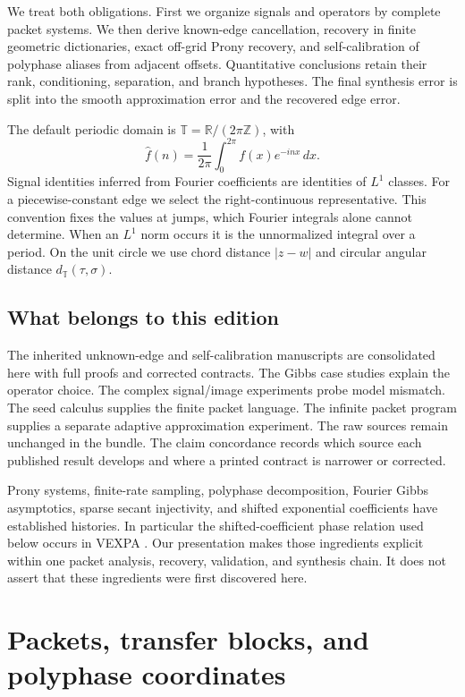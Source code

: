 \documentclass[11pt]{article}
\theoremstyle{definition}\newtheorem{definition}[theorem]{Definition}
\theoremstyle{remark}\newtheorem{remark}[theorem]{Remark}
\begin{document}
We treat both obligations. First we organize signals and operators by complete
packet systems. We then derive known-edge cancellation, recovery in finite
geometric dictionaries, exact off-grid Prony recovery, and self-calibration of
polyphase aliases from adjacent offsets. Quantitative conclusions retain their
rank, conditioning, separation, and branch hypotheses. The final synthesis
error is split into the smooth approximation error and the recovered edge error.

The default periodic domain is $\mathbb T=\mathbb R/(2\pi\mathbb Z)$, with
\[
 \widehat f(n)=\frac1{2\pi}\int_0^{2\pi}f(x)e^{-inx}\,dx.
\]
Signal identities inferred from Fourier coefficients are identities of
$L^1$ classes. For a piecewise-constant edge we select the right-continuous
representative. This convention fixes the values at jumps, which Fourier
integrals alone cannot determine. When an $L^1$ norm occurs it is the
unnormalized integral over a period. On the unit circle we use chord distance
$|z-w|$ and circular angular distance $d_{\mathbb T}(\tau,\sigma)$.

\subsection{What belongs to this edition}
The inherited unknown-edge and self-calibration manuscripts are consolidated
here with full proofs and corrected contracts. The Gibbs case studies explain
the operator choice. The complex signal/image experiments probe model
mismatch. The seed calculus supplies the finite packet language. The infinite
packet program supplies a separate adaptive approximation experiment.
The raw sources remain unchanged in the bundle. The claim concordance records
which source each published result develops and where a printed contract is
narrower or corrected.

Prony systems, finite-rate sampling, polyphase decomposition, Fourier Gibbs
asymptotics, sparse secant injectivity, and shifted exponential coefficients
have established histories. In particular the shifted-coefficient phase
relation used below occurs in VEXPA \cite{vexpa}. Our presentation makes those
ingredients explicit within one packet analysis, recovery, validation, and
synthesis chain. It does not assert that these ingredients were first
discovered here.


\section{Packets, transfer blocks, and polyphase coordinates}
\end{document}
